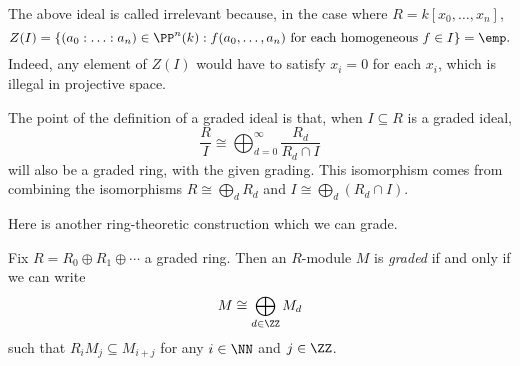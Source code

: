 \begin{remark}
	The above ideal is called irrelevant because, in the case where $R=k[x_0,\ldots,x_n]$,
	\[Z(I)=\left\{(a_0:\ldots:a_n)\in\PP^n(k):f(a_0,\ldots,a_n)\text{ for each homogeneous }f\in I\right\}=\emp.\]
	Indeed, any element of $Z(I)$ would have to satisfy $x_i=0$ for each $x_i$, which is illegal in projective space.
\end{remark}
The point of the definition of a graded ideal is that, when $I\subseteq R$ is a graded ideal,
\[\frac RI\cong\bigoplus_{d=0}^\infty\frac{R_d}{R_d\cap I}\]
will also be a graded ring, with the given grading. This isomorphism comes from combining the isomorphisms $R\cong\bigoplus_dR_d$ and $I\cong\bigoplus_d(R_d\cap I)$.

Here is another ring-theoretic construction which we can grade.
\begin{definition}
	Fix $R=R_0\oplus R_1\oplus\cdots$ a graded ring. Then an $R$-module $M$ is \textit{graded} if and only if we can write
	\[M\cong\bigoplus_{d\in\ZZ}M_d\]
	such that $R_iM_j\subseteq M_{i+j}$ for any $i\in\NN$ and $j\in\ZZ$.
\end{definition}

